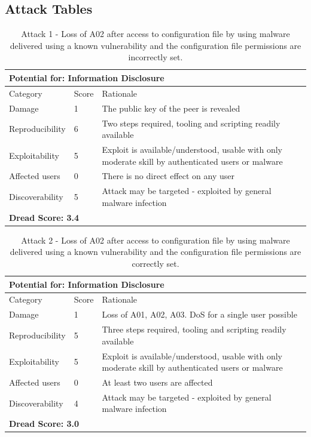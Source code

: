 \documentclass [11pt, proquest] {uwthesis}[2020/02/24]
\begin{document}
\subsection{Attack Tables}
\begin{table}[H]
\label{attack1-hsm}
\begin{tabular}{|m{3cm}|m{.9cm}|p{27em} |}
\multicolumn{3}{l}{Potential for: Information Disclosure}                   \\
\hline
Category & Score & Rationale                                                    \\
\hline
Damage          & 1     & The public key of the peer is revealed            \\
\hline
Reproducibility & 6     & Two steps required, tooling and scripting readily available    \\
\hline
Exploitability & 5      & Exploit is available/understood, usable with only moderate skill by authenticated users or malware \\
\hline
Affected users  & 0     & There is no direct effect on any user                     \\
\hline
Discoverability & 5     & Attack may be targeted - exploited by general malware infection \\
\hline
\multicolumn{3}{l}{\textbf{Dread Score: 3.4}} 
\end{tabular}
\caption{Attack 1 - Loss of A02 after access to configuration file by using malware delivered using a known vulnerability and the configuration file permissions are incorrectly set.}
\end{table}

\begin{table}[H]
\label{attack2-hsm}
\begin{tabular}{|m{3cm}|m{.9cm}|p{27em} |}
\multicolumn{3}{l}{Potential for: Information Disclosure}                   \\
\hline
Category & Score & Rationale \\
\hline
Damage          & 1     & Loss of A01, A02, A03. DoS for a single user possible            \\
\hline
Reproducibility & 5     & Three steps required, tooling and scripting readily available    \\
\hline
Exploitability & 5      & Exploit is available/understood, usable with only moderate skill by authenticated users or malware \\
\hline
Affected users  & 0     & At least two users are affected                      \\
\hline
Discoverability & 4     & Attack may be targeted - exploited by general malware infection \\
\hline
\multicolumn{3}{l}{\textbf{Dread Score: 3.0}} 
\end{tabular}
\caption{Attack 2 - Loss of A02 after access to configuration file by using malware delivered using a known vulnerability and the configuration file permissions are correctly set.}
\end{table}
\end{document}
